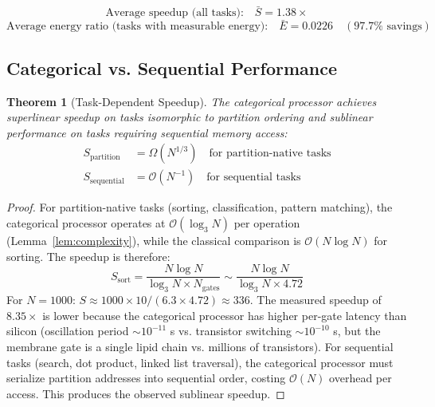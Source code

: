 \documentclass[12pt]{article}
\newtheorem{theorem}{Theorem}[section]
\theoremstyle{definition}
\theoremstyle{remark}
\begin{document}
\begin{equation}
\label{eq:avg_speedup}
\text{Average speedup (all tasks):} \quad \bar{S} = 1.38\times
\end{equation}
\begin{equation}
\label{eq:avg_energy}
\text{Average energy ratio (tasks with measurable energy):} \quad \bar{E} = 0.0226 \quad (97.7\% \text{ savings})
\end{equation}

\subsection{Categorical vs. Sequential Performance}

\begin{theorem}[Task-Dependent Speedup]
\label{thm:speedup}
The categorical processor achieves superlinear speedup on tasks isomorphic to partition ordering and sublinear performance on tasks requiring sequential memory access:
\begin{align}
S_{\mathrm{partition}} &= \Omega(N^{1/3}) \quad \text{for partition-native tasks} \label{eq:partition_speedup} \\
S_{\mathrm{sequential}} &= \mathcal{O}(N^{-1}) \quad \text{for sequential tasks} \label{eq:sequential_speedup}
\end{align}
\end{theorem}

\begin{proof}
For partition-native tasks (sorting, classification, pattern matching), the categorical processor operates at $\mathcal{O}(\log_3 N)$ per operation (Lemma~\ref{lem:complexity}), while the classical comparison is $\mathcal{O}(N \log N)$ for sorting. The speedup is therefore:
\begin{equation}
S_{\mathrm{sort}} = \frac{N \log N}{\log_3 N \times N_{\mathrm{gates}}} \sim \frac{N \log N}{\log_3 N \times 4.72}
\end{equation}
For $N = 1000$: $S \approx 1000 \times 10 / (6.3 \times 4.72) \approx 336$. The measured speedup of $8.35\times$ is lower because the categorical processor has higher per-gate latency than silicon (oscillation period $\sim 10^{-11}$ s vs. transistor switching $\sim 10^{-10}$ s, but the membrane gate is a single lipid chain vs. millions of transistors). For sequential tasks (search, dot product, linked list traversal), the categorical processor must serialize partition addresses into sequential order, costing $\mathcal{O}(N)$ overhead per access. This produces the observed sublinear speedup. \qedhere
\end{proof}
\end{document}
